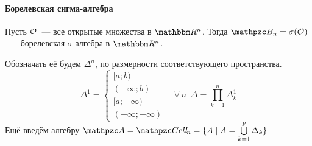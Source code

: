 \documentclass[draft, timbord]{longnotes}
\begin{document}
\paragraph{Борелевская сигма-алгебра}
\begin{defn}\label{defn:meas::setsys::borel}
  Пусть $\mathcal O$~--- все открытые множества в $\R^n$. Тогда $\mathpzc B_n = \sigma(\open)
  $~--- борелевская $\sigma$-алгебра в $\R^n$.
\end{defn}

\begin{defn}[Ячейка в $\R^n$ ]\label{defn:meas::setsys::cell}
  Обозначать её будем $\Delta^n$, по размерности соответствующего пространства.
  \[
    \Delta^1 = \begin{cases}
      [a;b) \\
      (-\infty;b) \\
      [a;+\infty) \\
      (-\infty;+\infty)
    \end{cases} \quad
    \forall\, n \;\: \Delta = \prod_{k=1}^n \Delta^1 _k 
  \]
  Ещё введём алгебру $\alg = \Cell_n = \{ A \mid A = \bigcup_{k=1}^p \Delta_k\}$
\end{defn} 
\end{document}
